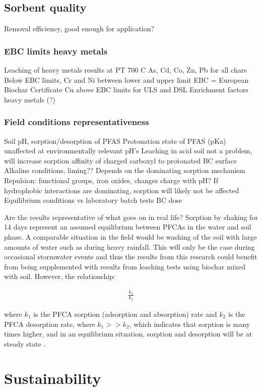 \subsection{Sorbent quality}
Removal efficiency, good enough for application?
\subsubsection{EBC limits heavy metals}
Leaching of heavy metals results at PT 700 C
    As, Cd, Co, Zn, Pb for all chars Below EBC limits, Cr and Ni between lower and upper limit
    EBC = European Biochar Certificate
    Cu above EBC limits for ULS and DSL
    Enrichment factors heavy metals (?)

\subsubsection{Field conditions representativeness}
Soil pH, sorption/desorption of PFAS
Protonation state of PFAS (pKa) unaffected at environmentally relevant pH’s
Leaching in acid soil not a problem, will increase sorption affinity of charged carboxyl to protonated BC surface
Alkaline conditions, liming?? 
    Depends on the dominating sorption mechanism
    Repulsion: functional groups, iron oxides, changes charge with pH?
    If hydrophobic interactions are dominating, sorption will likely not be affected
Equilibrium conditions vs laboratory batch tests
BC dose

Are the results representative of what goes on in real life? Sorption by shaking for 14 days represent an assumed equilibrium between PFCAs in the water and soil phase. A comparable situation in the field would be washing of the soil with large amounts of water such as during heavy rainfall. This will only be the case during occasional stormwater events and thus the results from this research could benefit from being supplemented with results from leaching tests using biochar mixed with soil. However, the relationship:

\begin{align}
    \frac{k_1}{k_2}
\end{align}

where \(k_1\) is the PFCA sorption (adsorption and absorption) rate and \(k_2\) is the PFCA desorption rate, where \(k_1>>k_2\), which indicates that sorption is many times higher, and in an equilibrium situation, sorption and desorption will be at steady state \citep{Cornelissen2005}. 


\section{Sustainability}
